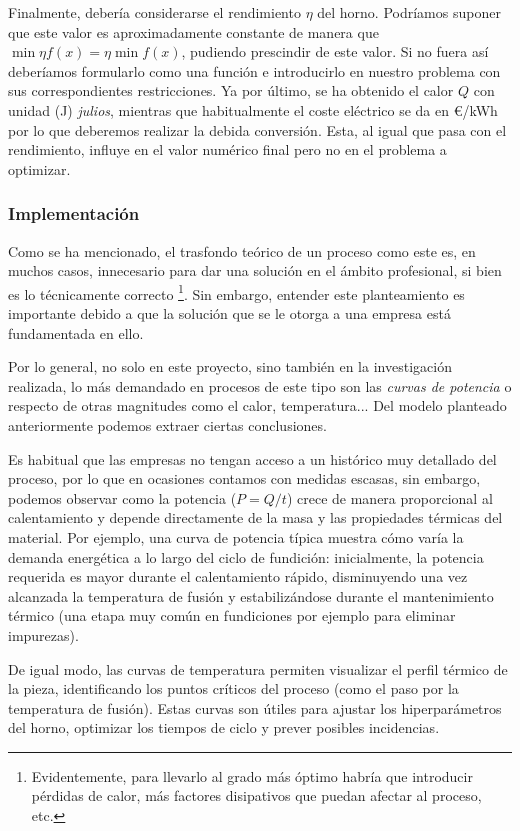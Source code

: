Finalmente, debería considerarse el rendimiento $\eta$ del horno. Podríamos suponer que este valor es aproximadamente constante de manera que $\min{\eta f(x)} = \eta \min{f(x)}$, pudiendo prescindir de este valor. Si no fuera así deberíamos formularlo como una función e introducirlo en nuestro problema con sus correspondientes restricciones. Ya por último, se ha obtenido el calor $Q$ con unidad (J) \textit{julios}, mientras que habitualmente el coste eléctrico se da en \euro/kWh por lo que deberemos realizar la debida conversión. Esta, al igual que pasa con el rendimiento, influye en el valor numérico final pero no en el problema a optimizar.
%
%
\subsubsection{Implementación}
%
%
Como se ha mencionado, el trasfondo teórico de un proceso como este es, en muchos casos, innecesario para dar una solución en el ámbito profesional, si bien es lo técnicamente correcto \footnote{Evidentemente, para llevarlo al grado más óptimo habría que introducir pérdidas de calor, más factores disipativos que puedan afectar al proceso, etc.}. Sin embargo, entender este planteamiento es importante debido a que la solución que se le otorga a una empresa está fundamentada en ello.

Por lo general, no solo en este proyecto, sino también en la investigación realizada, lo más demandado en procesos de este tipo son las \textit{curvas de potencia} o respecto de otras magnitudes como el calor, temperatura... Del modelo planteado anteriormente podemos extraer ciertas conclusiones.

Es habitual que las empresas no tengan acceso a un histórico muy detallado del proceso, por lo que en ocasiones contamos con medidas escasas, sin embargo, podemos observar como la potencia ($P = Q/t$) crece de manera proporcional al calentamiento y depende directamente de la masa y las propiedades térmicas del material. Por ejemplo, una curva de potencia típica muestra cómo varía la demanda energética a lo largo del ciclo de fundición: inicialmente, la potencia requerida es mayor durante el calentamiento rápido, disminuyendo una vez alcanzada la temperatura de fusión y estabilizándose durante el mantenimiento térmico (una etapa muy común en fundiciones por ejemplo para eliminar impurezas).

De igual modo, las curvas de temperatura permiten visualizar el perfil térmico de la pieza, identificando los puntos críticos del proceso (como el paso por la temperatura de fusión). Estas curvas son útiles para ajustar los hiperparámetros del horno, optimizar los tiempos de ciclo y prever posibles incidencias.
%
%
